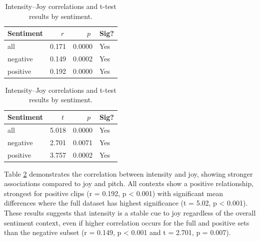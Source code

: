   \begin{table}[H]
    \centering
  
    \begin{subtable}{0.45\textwidth}
      \centering
      \caption{Intensity and Joy (r)}\label{tab:rq1_corr_intensity_joy}
      \begin{tabular}{l r r l}
        \toprule
        Sentiment & \(\;r\;\) & \(\;p\;\) & Sig? \\
        \midrule
        all      & 0.171 & 0.0000 & Yes \\
        negative & 0.149 & 0.0002 & Yes \\
        positive & 0.192 & 0.0000 & Yes \\
        \bottomrule
      \end{tabular}
    \end{subtable}\hfill
    \begin{subtable}{0.45\textwidth}
      \centering
      \caption{Intensity and Joy (t-test)}\label{tab:rq1_ttest_intensity_joy}
      \begin{tabular}{l r r l}
        \toprule
        Sentiment & \(\;t\;\) & \(\;p\;\) & Sig? \\
        \midrule
        all      & 5.018 & 0.0000 & Yes \\
        negative & 2.701 & 0.0071 & Yes \\
        positive & 3.757 & 0.0002 & Yes \\
        \bottomrule
      \end{tabular}
    \end{subtable}
  
    \caption{Intensity–Joy correlations and t-test results by sentiment.}
    \label{tab:rq1_intensity_joy_side_by_side}
  \end{table}
Table \ref{tab:rq1_intensity_joy_side_by_side} demonstrates the correlation between intensity and joy, showing stronger associations compared to joy and pitch. 
All contexts show a positive relationship, strongest for positive clips (r = 0.192, p < 0.001) with significant mean differences where the full dataset has highest significance (t = 5.02, p < 0.001). 
These results suggests that intensity is a stable cue to joy regardless of the overall sentiment context, even if higher correlation occurs for the full and positive sets than the negative subset (r = 0.149, p < 0.001 and t = 2.701, p = 0.007). 

